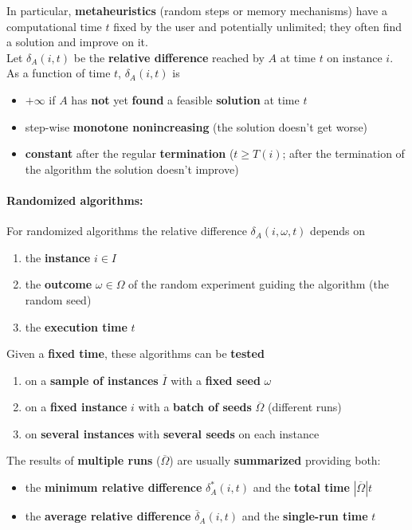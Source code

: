 In particular, \textbf{metaheuristics} (random steps or memory mechanisms) have a computational time $t$ fixed by the user and potentially unlimited; they often find a solution and improve on it.\\

Let $\delta_A (i, t)$ be the \textbf{relative difference} reached by $A$ at time $t$ on instance $i$.\\
As a function of time $t$, $\delta_A (i, t)$ is
\begin{itemize}
	\item $+ \infty$ if $A$ has \textbf{not} yet \textbf{found} a feasible \textbf{solution} at time $t$
	\item step-wise \textbf{monotone nonincreasing} (the solution doesn't get worse)
	\item \textbf{constant} after the regular \textbf{termination} ($t \geq T (i)$; after the termination of the algorithm the solution doesn't improve)
\end{itemize}

\vfill

\paragraph{Randomized algorithms:} For randomized algorithms the relative difference $\delta_A (i, \omega, t)$ depends on
\begin{enumerate}
	\item the \textbf{instance} $i \in I$
	\item the \textbf{outcome} $\omega \in \Omega$ of the random experiment guiding the algorithm (the random seed)
	\item the \textbf{execution time} $t$
\end{enumerate}

Given a \textbf{fixed time}, these algorithms can be \textbf{tested}
\begin{enumerate}
	\item on a \textbf{sample of instances} $\overline{I}$ with a \textbf{fixed seed} $\omega$
	\item on a \textbf{fixed instance} $i$ with a \textbf{batch of seeds} $\overline{\Omega}$ (different runs)
	\item on \textbf{several instances} with \textbf{several seeds} on each instance
\end{enumerate}

The results of \textbf{multiple runs} ($\overline{\Omega}$) are usually \textbf{summarized} providing both:
\begin{itemize}
	\item the \textbf{minimum relative difference} $\delta_A^\ast (i, t)$ and the \textbf{total time} $|\overline{\Omega}|t$
	\item the \textbf{average relative difference} $\overline{\delta}_A (i, t)$ and the \textbf{single-run time} $t$
\end{itemize}

